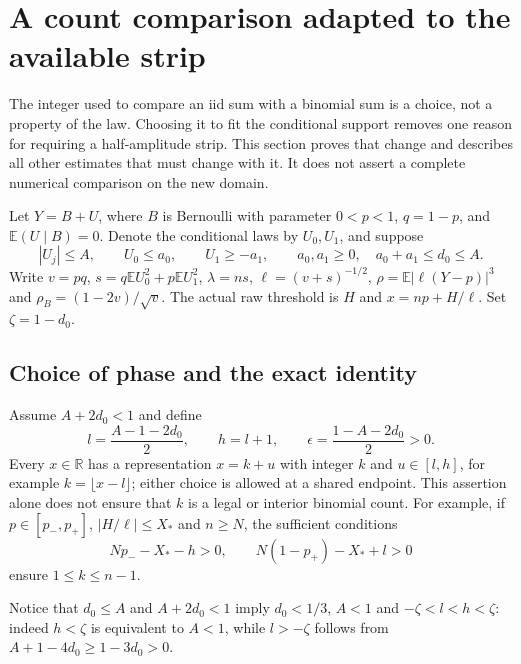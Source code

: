 \section{A count comparison adapted to the available strip}
\label{v10:counts}

The integer used to compare an iid sum with a binomial sum is a choice,
not a property of the law. Choosing it to fit the conditional support
removes one reason for requiring a half-amplitude strip. This section
proves that change and describes all other estimates that must change with
it. It does not assert a complete numerical comparison on the new domain.

Let $Y=B+U$, where $B$ is Bernoulli with parameter $0<p<1$,
$q=1-p$, and $\mathbb E(U\mid B)=0$. Denote the conditional laws by
$U_0,U_1$, and suppose
\[
 |U_j|\le A,\qquad U_0\le a_0,\qquad U_1\ge-a_1,
 \qquad a_0,a_1\ge0,\quad a_0+a_1\le d_0\le A.
\]
Write $v=pq$, $s=q\mathbb EU_0^2+p\mathbb EU_1^2$, $\lambda=ns$,
$\ell=(v+s)^{-1/2}$, $\rho=\mathbb E|\ell(Y-p)|^3$ and
$\rho_B=(1-2v)/\sqrt v$. The actual raw threshold is $H$ and
$x=np+H/\ell$. Set $\zeta=1-d_0$.

\subsection{Choice of phase and the exact identity}
Assume $A+2d_0<1$ and define
\begin{equation}\label{v10:count:phase}
 l=\frac{A-1-2d_0}{2},\qquad h=l+1,
 \qquad \epsilon=\frac{1-A-2d_0}{2}>0.
\end{equation}
Every $x\in\mathbb R$ has a representation $x=k+u$ with integer $k$ and
$u\in[l,h]$, for example $k=\lfloor x-l\rfloor$; either choice is allowed
at a shared endpoint. This assertion alone does not ensure that $k$ is a
legal or interior binomial count. For example, if $p\in[p_-,p_+]$,
$|H/\ell|\le X_*$ and $n\ge N$, the sufficient conditions
\[
 Np_--X_*-h>0,\qquad N(1-p_+)-X_*+l>0
\]
ensure $1\le k\le n-1$.

Notice that $d_0\le A$ and $A+2d_0<1$ imply $d_0<1/3$, $A<1$ and $-\zeta<l<h<\zeta$: indeed $h<\zeta$ is equivalent to $A<1$, while $l> -\zeta$ follows from $A+1-4d_0\ge1-3d_0>0$.

